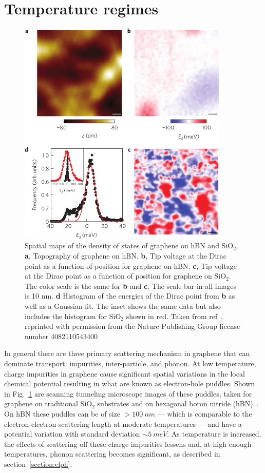\section{Temperature regimes}
\begin{figure}
\centering
\includegraphics[width=100mm]{figures/Dirac_fluid/charge_puddles.png}
\caption{Spatial maps of the density of states of graphene on hBN and SiO$_2$. \textbf{a}, Topography of graphene on hBN. \textbf{b}, Tip voltage at the Dirac point as a function of position for graphene on hBN. \textbf{c}, Tip voltage at the Dirac point as a function of position for graphene on SiO$_2$. The color scale is the same for \textbf{b} and \textbf{c}. The scale bar in all images is 10 nm. \textbf{d} Histogram of the energies of the Dirac point from \textbf{b} as well as a Gaussian fit. The inset shows the same data but also includes the histogram for SiO$_2$ shown in red. Taken from ref~\cite{xue_scanning_2011}, reprinted with permission from the Nature Publishing Group license number 4082110543400}
\label{fig:charge_puddles}
\end{figure}
In general there are three primary scattering mechanism in graphene that can dominate transport: impurities, inter-particle, and phonon. At low temperature, charge impurities in graphene cause significant spatial variations in the local chemical potential resulting in what are known as electron-hole puddles. Shown in Fig.~\ref{fig:charge_puddles} are scanning tunneling microscope images of these puddles, taken for graphene on traditional SiO$_2$ substrates and on hexagonal boron nitride (hBN)~\cite{xue_scanning_2011}. On hBN these puddles can be of size $>100~nm$ --- which is comparable to the electron-electron scattering length at moderate temperatures --- and have a potential variation with standard deviation ${\sim 5}~meV$. As temperature is increased, the effects of scattering off these charge impurities lessens and, at high enough temperatures, phonon scattering becomes significant, as described in section~\ref{section:elph}. 

